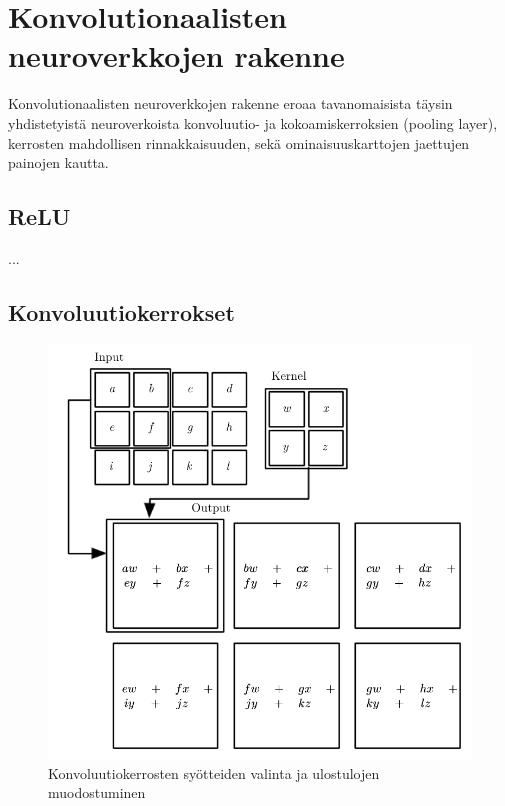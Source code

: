 \documentclass[finnish]{tktltiki2}
\theoremstyle{definition}
\theoremstyle{remark}
\begin{document}


  
  \section{Konvolutionaalisten neuroverkkojen rakenne}
    Konvolutionaalisten neuroverkkojen rakenne eroaa tavanomaisista täysin yhdistetyistä neuroverkoista konvoluutio- ja kokoamiskerroksien (pooling layer), kerrosten mahdollisen rinnakkaisuuden, sekä ominaisuuskarttojen jaettujen painojen kautta.   
    
    \subsection{ReLU}
    ...
    \subsection{Konvoluutiokerrokset}
    
    \begin{figure}[h]
      \centering
      \includegraphics[scale=0.4]{convolution}
      \caption{Konvoluutiokerrosten syötteiden valinta ja ulostulojen muodostuminen \cite{Goodfellow-et-al-2016}}
      \label{pic:convolution}
    \end{figure}
\end{document}

